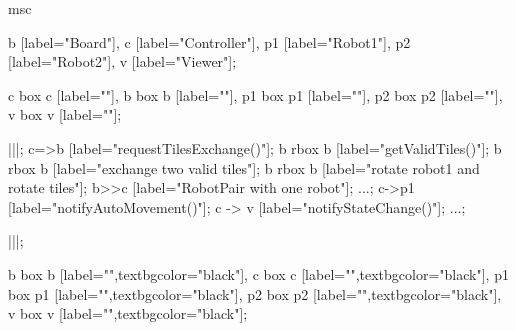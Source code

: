 \begin{msc}
msc
{

b [label="Board"],
c [label="Controller"],
p1 [label="Robot1"],
p2 [label="Robot2"],
v [label="Viewer"];

c box c [label=""],
b box b [label=""],
p1 box p1 [label=""],
p2 box p2 [label=""],
v box v [label=""];

|||;
c=>b [label="requestTilesExchange()"];
b rbox b [label="getValidTiles()"];
b rbox b [label="exchange two valid tiles"];
b rbox b [label="rotate robot1 and rotate tiles"];
b>>c [label="RobotPair with one robot"];
...;
c->p1 [label="notifyAutoMovement()"];
c -> v [label="notifyStateChange()"];
...;

|||;

b box b [label="",textbgcolor="black"],
c box c [label="",textbgcolor="black"],
p1 box p1 [label="",textbgcolor="black"],
p2 box p2 [label="",textbgcolor="black"],
v box v [label="",textbgcolor="black"];

}
\end{msc}

